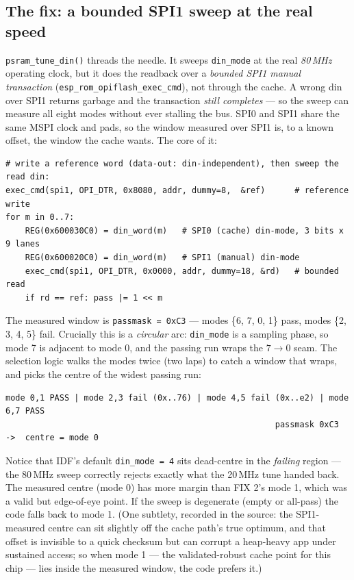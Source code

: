 \subsection{The fix: a bounded SPI1 sweep at the real speed}

\texttt{psram\_tune\_din()} threads the needle. It sweeps \texttt{din\_mode} at the
real \emph{80\,MHz} operating clock, but it does the readback over a \emph{bounded SPI1
manual transaction} (\texttt{esp\_rom\_opiflash\_exec\_cmd}), not through the cache. A
wrong din over SPI1 returns garbage and the transaction \emph{still completes} --- so
the sweep can measure all eight modes without ever stalling the bus. SPI0 and SPI1 share
the same MSPI clock and pads, so the window measured over SPI1 is, to a known offset,
the window the cache wants. The core of it:

\begin{lstlisting}[style=sh]
# write a reference word (data-out: din-independent), then sweep the read din:
exec_cmd(spi1, OPI_DTR, 0x8080, addr, dummy=8,  &ref)      # reference write
for m in 0..7:
    REG(0x600030C0) = din_word(m)   # SPI0 (cache) din-mode, 3 bits x 9 lanes
    REG(0x600020C0) = din_word(m)   # SPI1 (manual) din-mode
    exec_cmd(spi1, OPI_DTR, 0x0000, addr, dummy=18, &rd)   # bounded read
    if rd == ref: pass |= 1 << m
\end{lstlisting}

The measured window is \texttt{passmask = 0xC3} --- modes \{6, 7, 0, 1\} pass, modes
\{2, 3, 4, 5\} fail. Crucially this is a \emph{circular} arc: \texttt{din\_mode} is a
sampling phase, so mode 7 is adjacent to mode 0, and the passing run wraps the
$7\rightarrow0$ seam. The selection logic walks the modes twice (two laps) to catch a
window that wraps, and picks the centre of the widest passing run:

\begin{lstlisting}[style=sh]
mode 0,1 PASS | mode 2,3 fail (0x..76) | mode 4,5 fail (0x..e2) | mode 6,7 PASS
                                                       passmask 0xC3  ->  centre = mode 0
\end{lstlisting}

Notice that IDF's default \texttt{din\_mode = 4} sits dead-centre in the \emph{failing}
region --- the 80\,MHz sweep correctly rejects exactly what the 20\,MHz tune handed
back. The measured centre (mode 0) has more margin than FIX 2's mode 1, which was a
valid but edge-of-eye point. If the sweep is degenerate (empty or all-pass) the code
falls back to mode 1. (One subtlety, recorded in the source: the SPI1-measured centre
can sit slightly off the cache path's true optimum, and that offset is invisible to a
quick checksum but can corrupt a heap-heavy app under sustained access; so when mode 1
--- the validated-robust cache point for this chip --- lies inside the measured window,
the code prefers it.)

